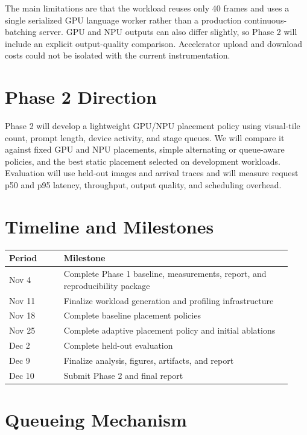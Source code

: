 \documentclass[10pt]{article}
\begin{document}
The main limitations are that the workload reuses only 40 frames and uses a single serialized GPU language worker rather than a production continuous-batching server. GPU and NPU outputs can also differ slightly, so Phase 2 will include an explicit output-quality comparison. Accelerator upload and download costs could not be isolated with the current instrumentation.

\section{Phase 2 Direction}

Phase 2 will develop a lightweight GPU/NPU placement policy using visual-tile count, prompt length, device activity, and stage queues. We will compare it against fixed GPU and NPU placements, simple alternating or queue-aware policies, and the best static placement selected on development workloads. Evaluation will use held-out images and arrival traces and will measure request p50 and p95 latency, throughput, output quality, and scheduling overhead.

\clearpage
\appendix

\section{Timeline and Milestones}

\begin{center}
\begin{tabular}{p{0.18\linewidth} p{0.75\linewidth}}
\toprule
\textbf{Period} & \textbf{Milestone} \\
\midrule
Nov 4  & Complete Phase 1 baseline, measurements, report, and reproducibility package \\
Nov 11 & Finalize workload generation and profiling infrastructure \\
Nov 18 & Complete baseline placement policies \\
Nov 25 & Complete adaptive placement policy and initial ablations \\
Dec 2  & Complete held-out evaluation \\
Dec 9  & Finalize analysis, figures, artifacts, and report \\
Dec 10 & Submit Phase 2 and final report \\
\bottomrule
\end{tabular}
\end{center}

\section{Queueing Mechanism}
\end{document}
